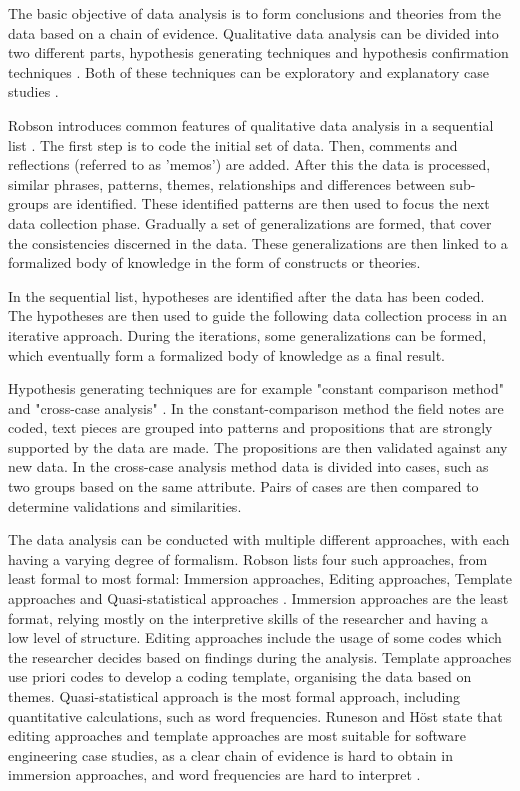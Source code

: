 \documentclass[english]{tktltiki2}
\theoremstyle{definition}
\theoremstyle{remark}
\begin{document}
The basic objective of data analysis is to form conclusions and theories from the data based on a chain of evidence. Qualitative data analysis can be divided into two different parts, hypothesis generating techniques and hypothesis confirmation techniques \cite{runeson2009guidelines}. Both of these techniques can be exploratory and explanatory case studies \cite{runeson2009guidelines}.  

Robson introduces common features of qualitative data analysis in a sequential list \cite{robson2002real}. The first step is to code the initial set of data. Then, comments and reflections (referred to as 'memos') are added. After this the data is processed, similar phrases, patterns, themes, relationships and differences between sub-groups are identified. These identified patterns are then used to focus the next data collection phase. Gradually a set of generalizations are formed, that cover the consistencies discerned in the data. These generalizations are then linked to a formalized body of knowledge in the form of constructs or theories. 

In the sequential list, hypotheses are identified after the data has been coded. The hypotheses are then used to guide the following data collection process in an iterative approach. During the iterations, some generalizations can be formed, which eventually form a formalized body of knowledge as a final result.

Hypothesis generating techniques are for example "constant comparison method" and "cross-case analysis" \cite{seaman1999qualitative}. In the constant-comparison method the field notes are coded, text pieces are grouped into patterns and propositions that are strongly supported by the data are made. The propositions are then validated against any new data. In the cross-case analysis method data is divided into cases, such as two groups based on the same attribute. Pairs of cases are then compared to determine validations and similarities. 

The data analysis can be conducted with multiple different approaches, with each having a varying degree of formalism. Robson lists four such approaches, from least formal to most formal: Immersion approaches, Editing approaches, Template approaches and Quasi-statistical approaches \cite{robson2012real}. Immersion approaches are the least format, relying mostly on the interpretive skills of the researcher and having a low level of structure. Editing approaches include the usage of some codes which the researcher decides based on findings during the analysis. Template approaches use priori codes to develop a coding template, organising the data based on themes. Quasi-statistical approach is the most formal approach, including quantitative calculations, such as word frequencies. Runeson and Höst state that editing approaches and template approaches are most suitable for software engineering case studies, as a clear chain of evidence is hard to obtain in immersion approaches, and word frequencies are hard to interpret \cite{runeson2009guidelines}. 
\end{document}

